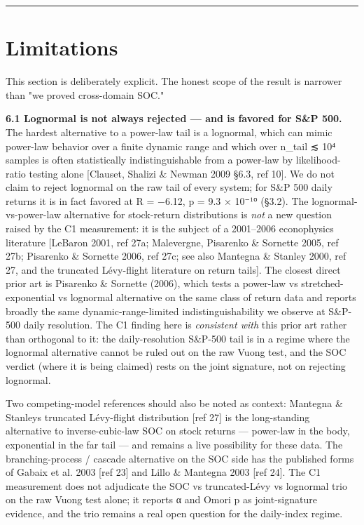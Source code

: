 \documentclass[
  11pt]{article}
\begin{document}
\begin{center}\rule{0.5\linewidth}{0.5pt}\end{center}

\section{Limitations}\label{sec:6}

This section is deliberately explicit. The honest scope of the result is
narrower than "we proved cross-domain SOC."

\textbf{6.1 Lognormal is not always rejected --- and is favored for S\&P
500.} The hardest alternative to a power-law tail is a lognormal, which
can mimic power-law behavior over a finite dynamic range and which over
n\_tail ≲ 10⁴ samples is often statistically indistinguishable from a
power-law by likelihood-ratio testing alone {[}Clauset, Shalizi \&
Newman 2009 §6.3, ref 10{]}. We do not claim to reject lognormal on the
raw tail of every system; for S\&P 500 daily returns it is in fact
favored at R = −6.12, p = 9.3 × 10⁻¹⁰ (§3.2). The lognormal-vs-power-law
alternative for stock-return distributions is \emph{not} a new question
raised by the C1 measurement: it is the subject of a 2001--2006
econophysics literature {[}LeBaron 2001, ref 27a; Malevergne, Pisarenko
\& Sornette 2005, ref 27b; Pisarenko \& Sornette 2006, ref 27c; see also
Mantegna \& Stanley 2000, ref 27, and the truncated Lévy-flight
literature on return tails{]}. The closest direct prior art is Pisarenko
\& Sornette (2006), which tests a power-law vs stretched-exponential vs
lognormal alternative on the same class of return data and reports
broadly the same dynamic-range-limited indistinguishability we observe
at S\&P-500 daily resolution. The C1 finding here is \emph{consistent
with} this prior art rather than orthogonal to it: the daily-resolution
S\&P-500 tail is in a regime where the lognormal alternative cannot be
ruled out on the raw Vuong test, and the SOC verdict (where it is being
claimed) rests on the joint signature, not on rejecting lognormal.

Two competing-model references should also be noted as context: Mantegna
\& Stanley\textquotesingle s truncated Lévy-flight distribution {[}ref
27{]} is the long-standing alternative to inverse-cubic-law SOC on stock
returns --- power-law in the body, exponential in the far tail --- and
remains a live possibility for these data. The branching-process /
cascade alternative on the SOC side has the published forms of Gabaix et
al. 2003 {[}ref 23{]} and Lillo \& Mantegna 2003 {[}ref 24{]}. The C1
measurement does not adjudicate the SOC vs truncated-Lévy vs lognormal
trio on the raw Vuong test alone; it reports α and Omori p as
joint-signature evidence, and the trio remains a real open question for
the daily-index regime.
\end{document}
